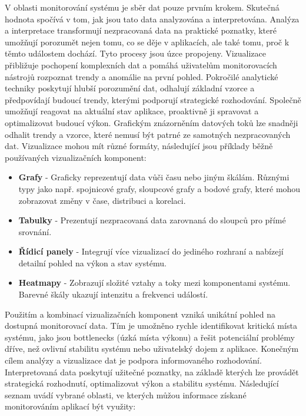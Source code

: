 
V oblasti monitorování systému je sběr dat pouze prvním krokem. Skutečná hodnota spočívá v tom, jak jsou tato data analyzována a interpretována. Analýza a interpretace transformují nezpracovaná data na praktické poznatky, které umožňují porozumět nejen tomu, co se děje v aplikacích, ale také tomu, proč k těmto událostem dochází. \cite{Majors2022} Tyto procesy jsou úzce propojeny. Vizualizace přibližuje pochopení komplexních dat a pomáhá uživatelům monitorovacích nástrojů rozpoznat trendy a anomálie na první pohled. Pokročilé analytické techniky poskytují hlubší porozumění dat, odhalují základní vzorce a předpovídají budoucí trendy, kterými podporují strategické rozhodování. Společně umožňují reagovat na aktuální stav aplikace, proaktivně ji spravovat a optimalizovat budoucí výkon. Grafickým znázorněním datových toků lze snadněji odhalit trendy a vzorce, které nemusí být patrné ze samotných nezpracovaných dat. Vizualizace mohou mít různé formáty, následující jsou příklady běžně používaných vizualizačních komponent:

\begin{itemize}
    \item \textbf{Grafy} - Graficky reprezentují data vůči času nebo jiným škálám. Různými typy jako např. spojnicové grafy, sloupcové grafy a bodové grafy, které mohou zobrazovat změny v čase, distribuci a korelaci.
    \item \textbf{Tabulky} - Prezentují nezpracovaná data zarovnaná do sloupců pro přímé srovnání.
    \item \textbf{Řídicí panely} - Integrují více vizualizací do jediného rozhraní a nabízejí detailní pohled na výkon a stav systému.
    \item \textbf{Heatmapy} - Zobrazují složité vztahy a toky mezi komponentami systému. Barevné škály ukazují intenzitu a frekvenci událostí.
\end{itemize}

Použitím a kombinací vizualizačních komponent vzniká unikátní pohled na dostupná monitorovací data. Tím je umožněno rychle identifikovat kritická místa systému, jako jsou bottlenecks (úzká místa výkonu) a řešit potenciální problémy dříve, než ovlivní stabilitu systému nebo uživatelský dojem z aplikace. \cite{Chapman2023} Konečným cílem analýzy a vizualizace dat je podpora informovaného rozhodování. Interpretovaná data poskytují užitečné poznatky, na základě kterých lze provádět strategická rozhodnutí, optimalizovat výkon a stabilitu systému. \cite{Majors2022} Následující seznam uvádí vybrané oblasti, ve kterých můžou informace získané monitorováním aplikací být využity:

